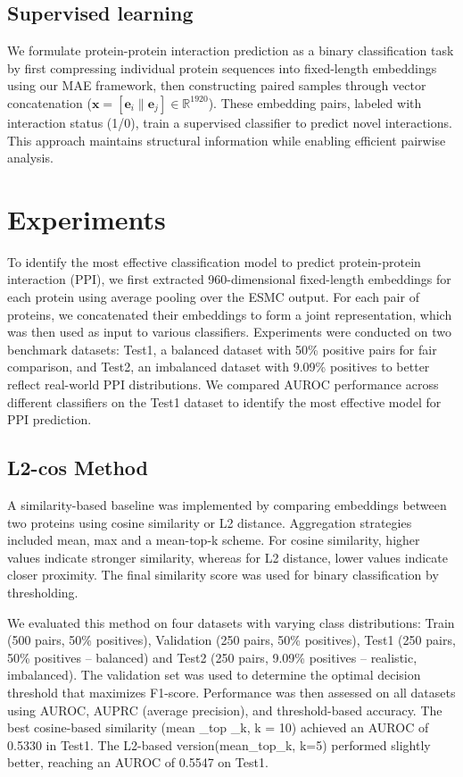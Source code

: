\documentclass{article}
\begin{document}
	
	\subsection{Supervised learning}

 We formulate protein-protein interaction prediction as a binary classification task by first compressing individual protein sequences into fixed-length embeddings using our MAE framework, then constructing paired samples through vector concatenation ($\mathbf{x} = [\mathbf{e}_i \|\mathbf{e}_j] \in \mathbb{R}^{1920}$). These embedding pairs, labeled with interaction status (1/0), train a supervised classifier to predict novel interactions. This approach maintains structural information while enabling efficient pairwise analysis.
	
	\section{Experiments}
    
To identify the most effective classification model to predict protein-protein interaction (PPI), we first extracted 960-dimensional fixed-length embeddings for each protein using average pooling over the ESMC output. For each pair of proteins, we concatenated their embeddings to form a joint representation, which was then used as input to various classifiers. Experiments were conducted on two benchmark datasets: Test1, a balanced dataset with 50\% positive pairs for fair comparison, and Test2, an imbalanced dataset with 9.09\% positives to better reflect real-world PPI distributions. We compared AUROC performance across different classifiers on the Test1 dataset to identify the most effective model for PPI prediction.

	\subsection{L2-cos Method}
    
A similarity-based baseline was implemented by comparing embeddings between two proteins using cosine similarity or L2 distance. Aggregation strategies included mean, max and a mean-top-k scheme. For cosine similarity, higher values indicate stronger similarity, whereas for L2 distance, lower values indicate closer proximity. The final similarity score was used for binary classification by thresholding.

We evaluated this method on four datasets with varying class distributions: Train (500 pairs, 50\% positives), Validation (250 pairs, 50\% positives), Test1 (250 pairs, 50\% positives – balanced) and Test2 (250 pairs, 9.09\% positives – realistic, imbalanced). The validation set was used to determine the optimal decision threshold that maximizes F1-score. Performance was then assessed on all datasets using AUROC, AUPRC (average precision), and threshold-based accuracy. The best cosine-based similarity (mean \_top \_k, k = 10) achieved an AUROC of 0.5330 in Test1. The L2-based version(mean\_top\_k, k=5) performed slightly better, reaching an AUROC of 0.5547 on Test1.
\end{document}

